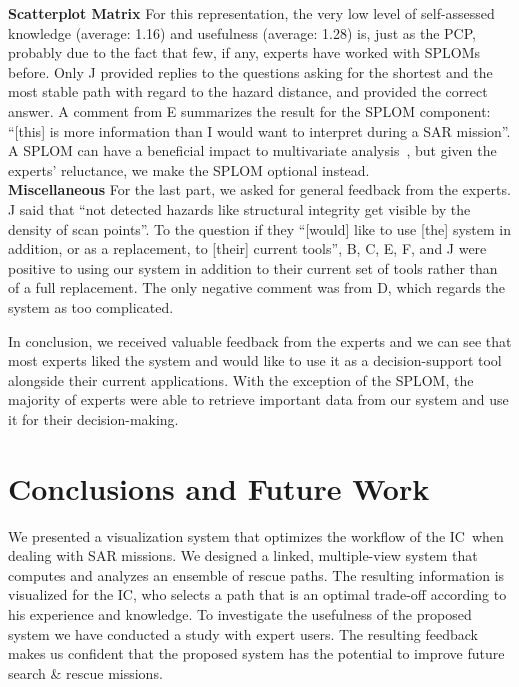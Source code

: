 \documentclass{egpubl}
\def\IC{IC}
\begin{document}
\textbf{Scatterplot Matrix} For this representation, the very low level of self-assessed knowledge (average: 1.16) and usefulness (average: 1.28) is, just as the PCP, probably due to the fact that few, if any, experts have worked with SPLOMs before. Only J provided replies to the questions asking for the shortest and the most stable path with regard to the hazard distance, and provided the correct answer. A comment from E summarizes the result for the SPLOM component: ``[this] is more information than I would want to interpret during a SAR mission''. A SPLOM can have a beneficial impact to multivariate analysis~\cite{6064985}, but given the experts' reluctance, we make the SPLOM optional instead.\\
\textbf{Miscellaneous} For the last part, we asked for general feedback from the experts. J said that ``not detected hazards like structural integrity get visible by the density of scan points''. To the question if they ``[would] like to use [the] system in addition, or as a replacement, to [their] current tools'', B, C, E, F, and J were positive to using our system in addition to their current set of tools rather than of a full replacement. The only negative comment was from D, which regards the system as too complicated. 

In conclusion, we received valuable feedback from the experts and we can see that most experts liked the system and would like to use it as a decision-support tool alongside their current applications. With the exception of the SPLOM, the majority of experts were able to retrieve important data from our system and use it for their decision-making.


\section{Conclusions and Future Work} \label{sec:conclusion}
We presented a visualization system that optimizes the workflow of the \IC\ when dealing with SAR missions. We designed a linked, multiple-view system that computes and analyzes an ensemble of rescue paths. The resulting information is visualized for the \IC , who selects a path that is an optimal trade-off according to his experience and knowledge. To investigate the usefulness of the proposed system we have conducted a study with expert users. The resulting feedback makes us confident that the proposed system has the potential to improve future search \& rescue missions.
\end{document}
